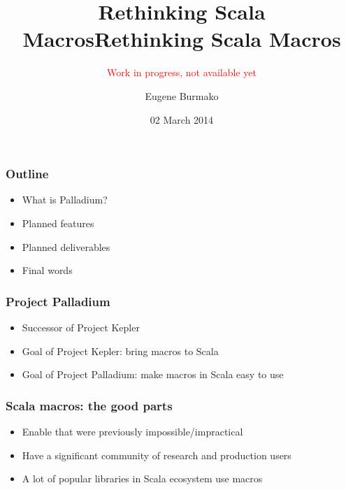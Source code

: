 \documentclass[svgnames,dvipsnames,hyperref={bookmarks=false}]{beamer}
\title{Rethinking Scala Macros}
\begin{document}
\title{Rethinking Scala Macros}
\subtitle{\textcolor{red}{Work in progress, not available yet}}
\author{Eugene Burmako}
\date{02 March 2014}
{
\begin{frame}
  \titlepage
\end{frame}
}

\begin{frame}[fragile]
\frametitle{Outline}

\begin{itemize}
\item What is Palladium?
\item Planned features
\item Planned deliverables
\item Final words
\end{itemize}
\end{frame}

\begin{frame}[fragile]
\frametitle{}

\vskip40pt
\begin{center}
\end{center}
\end{frame}

\begin{frame}[fragile]
\frametitle{Project Palladium}

\begin{itemize}
\item Successor of Project Kepler
\item Goal of Project Kepler: bring macros to Scala
\item Goal of Project Palladium: make macros in Scala easy to use
\end{itemize}
\end{frame}

\begin{frame}[fragile]
\frametitle{Scala macros: the good parts}

\begin{itemize}
\item Enable  that were previously impossible/impractical
\item Have a significant community of research and production users
\item A lot of popular libraries in Scala ecosystem use macros
\end{itemize}
\end{frame}
\end{document}
